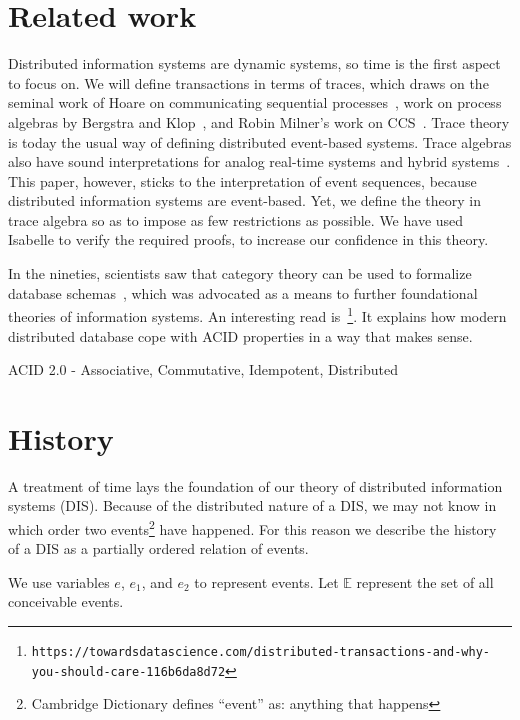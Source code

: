 \documentclass{elsarticle}
\begin{document}
	\section{Related work}
\label{sct:Related work}
	Distributed information systems are dynamic systems,
	so time is the first aspect to focus on.
	We will define transactions in terms of traces,
	which draws on the seminal work of Hoare on communicating sequential processes~\cite{HoareHe98},
	work on process algebras by Bergstra and Klop~\cite{DBLP:journals/iandc/BergstraK84}, and
	Robin Milner's work on CCS~\cite{Milner1989}.
	Trace theory is today the usual way of defining distributed event-based systems.
	Trace algebras also have sound interpretations for analog real-time systems and hybrid systems~\cite{Foster17b}.
	This paper, however, sticks to the interpretation of event sequences, because distributed information systems are event-based.
	Yet, we define the theory in trace algebra so as to impose as few restrictions as possible.
	We have used Isabelle to verify the required proofs,
	to increase our confidence in this theory.
	
\cite{Foster17c}
	In the nineties, scientists saw that category theory can be used to formalize database schemas~\cite{Frederiks1997},
	which was advocated as a means to further foundational theories of information systems.
	An interesting read is~\cite{Foster17c}\footnote{\tt\tiny https://towardsdatascience.com/distributed-transactions-and-why-you-should-care-116b6da8d72}.
	It explains how modern distributed database cope with ACID properties in a way that makes sense.

	ACID 2.0 - Associative, Commutative, Idempotent, Distributed

\section{History}
\label{sct:History}
	A treatment of time lays the foundation of our theory of distributed information systems (DIS).
	Because of the distributed nature of a DIS,
	we may not know in which order two events\footnote{Cambridge Dictionary defines ``event'' as: anything that happens} have happened.
	For this reason we describe the history of a DIS as a partially ordered relation of events.

	We use variables $e$, $e_1$, and $e_2$ to represent events.
	Let $\mathbb E$ represent the set of all conceivable events.
\end{document}
